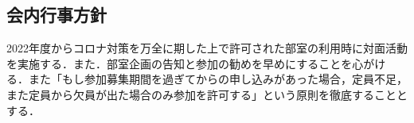\subsection*{会内行事方針}

2022年度からコロナ対策を万全に期した上で許可された部室の利用時に対面活動を実施する．また．部室企画の告知と参加の勧めを早めにすることを心がける．また「もし参加募集期間を過ぎてからの申し込みがあった場合，定員不足，また定員から欠員が出た場合のみ参加を許可する」という原則を徹底することとする．